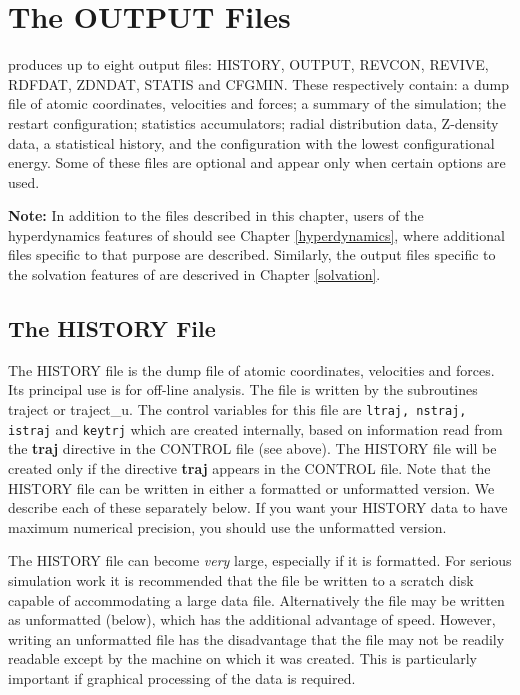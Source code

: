
\section{The OUTPUT Files}
\label{outputfiles}

\D{} produces up to eight output files: HISTORY, OUTPUT, REVCON, REVIVE,
RDFDAT, ZDNDAT, STATIS and CFGMIN. These respectively contain: a dump file of
atomic coordinates, velocities and forces; a summary of the
simulation; the restart configuration; statistics accumulators; radial
distribution data, Z-density data, a statistical history, and the
configuration with the lowest configurational energy. Some of these
files are optional and appear only when certain options are used.

{\bf Note:} In addition to the files described in this chapter, users of the
hyperdynamics features of \D{} should see Chapter \ref{hyperdynamics}, where
additional files specific to that purpose are described. Similarly, the output
files specific to the solvation features of \D{} are descrived in Chapter
\ref{solvation}.

\subsection{The HISTORY File}
\label{historyfile}

The HISTORY file is the dump file of atomic coordinates, velocities
and forces. Its principal use is for off-line analysis. The file is
written by the subroutines {\sc traject} or {\sc traject\_u}. The
control variables for this file are {\tt ltraj, nstraj, istraj} and
{\tt keytrj} which are created internally, based on information read
from the {\bf traj} directive in the CONTROL file (see above). The
HISTORY file will be created only if the directive {\bf traj} appears
in the CONTROL file.  Note that the HISTORY file can be written in
either a formatted or unformatted version. We describe each of these
separately below. If you want your HISTORY data to have maximum numerical
precision, you should use the unformatted version.

The HISTORY file can become {\em very} large, especially if it is
formatted. For serious simulation work it is recommended that the file
be written to a scratch disk capable of accommodating a large data
file.  Alternatively the file may be written as unformatted (below),
which has the additional advantage of speed. However, writing an
unformatted file has the disadvantage that the file may not be readily
readable except by the machine on which it was created. This is
particularly important if graphical processing of the data is
required.

